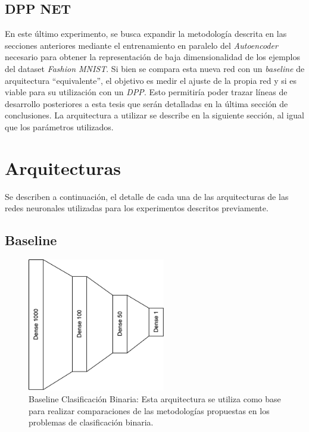 \vspace{0.2cm} 

\subsection{DPP NET}\label{experiment:dpp_net}

En este último experimento, se busca expandir la metodología descrita en las secciones anteriores mediante el entrenamiento en paralelo del \textit{Autoencoder} necesario para obtener la representación de baja dimensionalidad de los ejemplos del dataset \textit{Fashion MNIST}. Si bien se compara esta nueva red con un \textit{baseline} de arquitectura ``equivalente'', el objetivo es medir el ajuste de la propia red y si es viable para su utilización con un \textit{DPP}. Esto permitiría poder trazar líneas de desarrollo posteriores a esta tesis que serán detalladas en la última sección de conclusiones. La arquitectura a utilizar se describe en la siguiente sección, al igual que los parámetros utilizados. 


\section{Arquitecturas}

Se describen a continuación, el detalle de cada una de las arquitecturas de las redes neuronales utilizadas para los experimentos descritos previamente. 

\subsection{Baseline}

\begin{figure}[ht]
    \centering
    \includegraphics[width=6cm]{img/tesis/baseline_2D.drawio.png}
    \caption{Baseline Clasificación Binaria: Esta arquitectura se utiliza como base para realizar comparaciones de las metodologías propuestas en los problemas de clasificación binaria.}
    \label{fig:baseline_2d}
\end{figure}

